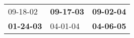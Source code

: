 \begin{supertabular}{p{0.33\columnwidth}p{0.33\columnwidth}p{0.33\columnwidth}}
          09-18-02\textsuperscript{} &  \textbf{09-17-03\textsuperscript{}} &  \textbf{09-02-04\textsuperscript{}} \\
 \textbf{01-24-03\textsuperscript{}} &           04-01-04\textsuperscript{} &  \textbf{04-06-05\textsuperscript{}} \\
\end{supertabular}
